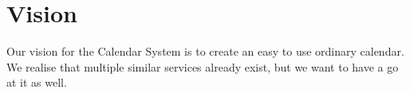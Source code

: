 \section{Vision}
Our vision for the Calendar System is to create an easy to use ordinary calendar. We realise that multiple similar services already exist, but we want to have a go at it as well.
\newpage
